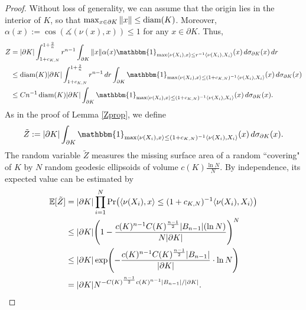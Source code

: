 \begin{proof}%
	Without loss of generality, we can assume that the origin lies in the interior of $K$, so that $\max_{x\in \partial K}\|x\| \leq \operatorname{diam}(K)$. 
	Moreover, $\alpha(x) := \cos(\measuredangle(\nu(x),x)) \leq 1$ for any $x\in\partial K$. Thus,
	\begin{align*}Z & =|\partial K|\int_{1+c_{K,N}}^{1+\frac{2}{n}}r^{n-1}\int_{\partial K}\|x\|\alpha(x)\mathbbm{1}_{\max\langle\nu(X_{i}),x\rangle\leq r^{-1}\langle\nu(X_{i}),X_{i}\rangle}(x)\,d\sigma_{\partial K}(x)\,dr\\
	& \leq\diam(K)|\partial K|\int_{1+c_{K,N}}^{1+\frac{2}{n}}r^{n-1}\,dr\int_{\partial K}\mathbbm{1}_{\max\langle\nu(X_{i}),x\rangle\leq(1+c_{K,N})^{-1}\langle\nu(X_{i}),X_{i}\rangle}(x)\,d\sigma_{\partial K}(x)\\
	& \leq Cn^{-1}\diam(K)|\partial K|\int_{\partial K}\mathbbm{1}_{\max\langle\nu(X_{i}),x\rangle\leq(1+c_{K,N})^{-1}\langle\nu(X_{i}),X_{i}\rangle}(x)\,d\sigma_{\partial K}(x).%
	\end{align*}
As in the proof of Lemma \ref{Zprop}, we  define 
\[
\tilde Z := |\partial K|\int_{\partial K} \mathbbm{1}_{\max\langle\nu(X_{i}),x\rangle\leq(1+c_{K,N})^{-1}\langle\nu(X_{i}),X_{i}\rangle}(x)\,d\sigma_{\partial K}(x).
\] 
The random variable $\tilde Z$  measures the missing surface area of a random  ``covering" of $K$ by $ N $ random geodesic ellipsoids of volume $ c(K)\frac{\ln N}{N}$. By independence, its expected value  can be estimated by
	\begin{align*}\E[\tilde{Z}] & = |\partial K| \prod_{i=1}^{N}\Pr\left(\langle\nu(X_{i}),x\rangle\leq(1+c_{K,N})^{-1}\langle\nu(X_{i}),X_{i}\rangle\right)\\
	& \leq |\partial K|\left(1-\frac{c(K)^{n-1}C(K)^{\frac{n-1}{2}}|B_{n-1}|(\ln N)}{N|\partial K|}\right)^{N}\\
	& \leq |\partial K|\exp\left(-\frac{c(K)^{n-1}C(K)^{\frac{n-1}{2}}|B_{n-1}|}{|\partial K|}\cdot\ln N\right)\\
	& =|\partial K| N^{-C(K)^{\frac{n-1}{2}}c(K)^{n-1}|B_{n-1}|/|\partial K|}.
	\end{align*}
	

\end{proof}
